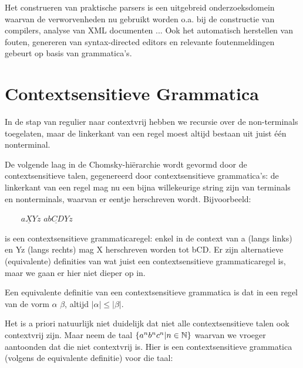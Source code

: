 Het construeren van praktische parsers is een uitgebreid
onderzoeksdomein waarvan de verworvenheden nu gebruikt worden o.a. bij
de constructie van compilers, analyse van XML documenten ... Ook het
automatisch herstellen van fouten, genereren van syntax-directed
editors en relevante foutenmeldingen gebeurt op basis van
grammatica's.









\clearpage
\section{Contextsensitieve Grammatica}

In de stap van regulier naar contextvrij hebben we recursie over de
non-terminals toegelaten, maar de linkerkant van een regel moest
altijd bestaan uit juist \'{e}\'{e}n nonterminal.


De volgende laag in de Chomsky-hi\"erarchie wordt gevormd door de
contextsensitieve talen, gegenereerd door contextsensitieve
grammatica's: de linkerkant van een regel mag nu een bijna
willekeurige string zijn van terminals en nonterminals, waarvan er
eentje herschreven wordt. Bijvoorbeeld: 

$~~~~~~~~~a\underline{X}Yz$ \rpijl $a\underline{bCD}Yz$ 


is een contextsensitieve grammaticaregel: enkel in de context van a
(langs links) en Yz (langs rechts) mag X herschreven worden tot bCD.
Er zijn alternatieve (equivalente) definities van wat juist een
contextsensitieve grammaticaregel is, maar we gaan er hier niet
dieper op in.


Een equivalente definitie van een contextsensitieve grammatica is dat
in een regel van de vorm $\alpha$ \rpijl $\beta$, altijd $|\alpha| \leq
|\beta|$.


Het is a priori natuurlijk niet duidelijk dat niet alle
contextsensitieve talen ook contextvrij zijn. Maar neem de taal
$\{a^nb^nc^n|n \in \mathbb{N}\}$ waarvan we vroeger aantoonden dat die niet
contextvrij is. Hier is een contextsensitieve grammatica (volgens de
equivalente definitie) voor die taal:

